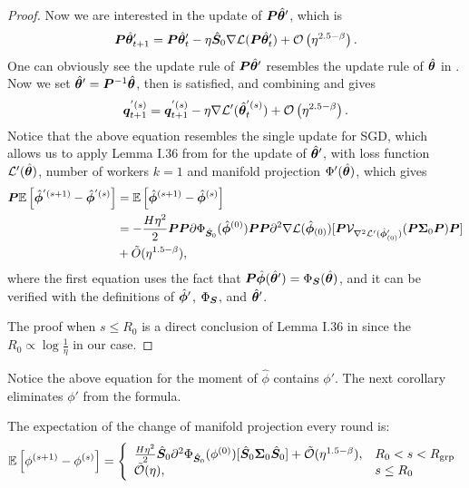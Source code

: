 \begin{proof}
    Now we are interested in the update of ${\bm{P}} \hat{{\bm{\theta}}}'$, which is 
    \begin{align}
        {\bm{P}} \hat{{\bm{\theta}}}'_{t+1} = {\bm{P}} \hat{{\bm{\theta}}}'_t - \eta \hat{{\bm{S}}}_0 \nabla \mathcal{L}({\bm{P}} \hat{{\bm{\theta}}}'_t) + \mathcal{O}\left(\eta^{2.5-\beta}\right).\label{equ:fix-pre-conditioner}
    \end{align}
    One can obviously see the update rule of ${\bm{P}}\hat{{\bm{\theta}}}'$ resembles the update rule of $\hat{{\bm{\theta}}}$ in . Now we set $\hat{{\bm{\theta}}}' = {\bm{P}}^{-1}\hat{{\bm{\theta}}}$, then  is satisfied, and combining  and  gives
    \begin{align*}
        {\bm{q}}_{t+1}^{'(s)} = {\bm{q}}_{t+1}^{'(s)} - \eta \nabla \mathcal{L}'(\hat{{\bm{\theta}}}_{t}^{'(s)}) + \mathcal{O}\left(\eta^{2.5-\beta}\right).
    \end{align*}
    Notice that the above equation resembles the single update for SGD, which allows us to apply Lemma I.36 from \citet{gu2023andwhendoeslocal} for the update of $\hat{{\bm{\theta}}}'$, with loss function $\mathcal{L}'(\hat{{\bm{\theta}}})$, number of workers $k=1$ and manifold projection $\Phi'(\hat{{\bm{\theta}}})$, which gives
    \begin{align*}
    {\bm{P}} \mathbb{E}\left[ \hat{{\bm{\phi}}}^{'(s+1)} - \hat{{\bm{\phi}}}^{'(s)} \right] &= \mathbb{E}\left[ \hat{{\bm{\phi}}}^{(s+1)} - \hat{{\bm{\phi}}}^{(s)} \right]\\
    &=-\frac{H \eta^2}{2} {\bm{P}} {\bm{P}}\partial \Phi_{\hat{{\bm{S}}}_0}(\hat{{\bm{\phi}}}^{(0)}){\bm{P}}{\bm{P}} \partial^2 \nabla \mathcal{L}(\hat{{\bm{\phi}}}_{(0)}) [{\bm{P}} \mathcal{V}_{\nabla^2 \mathcal{L}'(\hat{{\bm{\phi}}}'_{(0)})}({\bm{P}} {\bm{\Sigma}}_0{\bm{P}}){\bm{P}}] \\
    &+ \tilde{O}(\eta^{1.5-\beta}),
\end{align*}
where the first equation uses the fact that ${\bm{P}}\hat{{\bm{\phi}}}(\hat{{\bm{\theta}}}')=\Phi_{{\bm{S}}}(\hat{{\bm{\theta}}})$, and it can be verified with the definitions of $\hat{{\bm{\phi}}}'$, $\Phi_{\bm{S}}$, and $\hat{{\bm{\theta}}}'$.  

The proof when $s \le R_0$ is a direct conclusion of Lemma I.36 in \citet{gu2023andwhendoeslocal} since the $R_0 \propto \log \frac{1}{\eta}$ in our case.
\end{proof}
Notice the above equation for the moment of $\hat\phi$ contains $\phi'$. The next corollary eliminates $\phi'$ from the formula.
\begin{corollary}\label{cly:1st-moment}
The expectation of the change of manifold projection every round is:
\[
\mathbb{E}\left[ \phi^{(s+1)} - \phi^{(s)} \right] = \left\{
\begin{array}{ll}
\frac{H \eta^2}{2} \hat{{\bm{S}}}_0 \partial^2 \Phi_{\hat{{\bm{S}}}_0}(\phi^{(0)})[\hat{{\bm{S}}}_0 {\bm{\Sigma}}_0 \hat{{\bm{S}}}_0] + \tilde{\mathcal{O}}(\eta^{1.5-\beta}), & R_0 < s < R_{\mathrm{grp}} \\
\tilde{\mathcal{O}}(\eta), & s \leq R_0
\end{array}
\right.
\]
\end{corollary}
